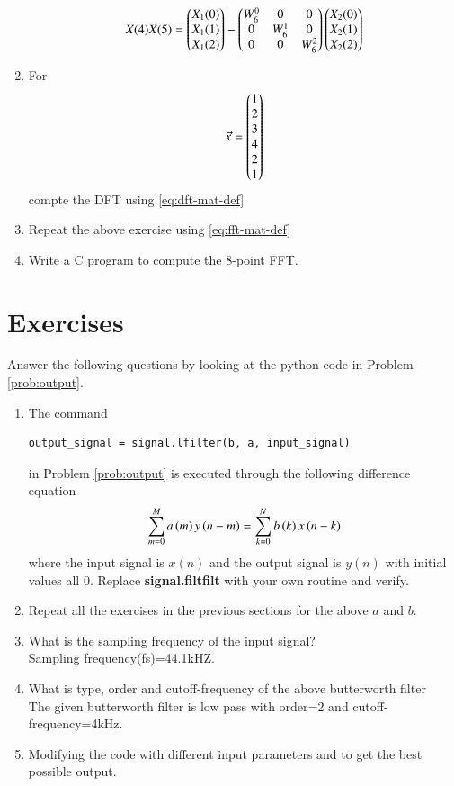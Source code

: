 \documentclass[journal,12pt,twocolumn]{IEEEtran}
\renewcommand\thesection{\arabic{section}}
\begin{document}
\begin{enumerate}[label=\arabic*.,ref=\thesection.\theenumi]
\begin{equation}
{			X(4) \\ 
			X(5) 
		}
		=
		\begin{pmatrix}
			X_{1}(0) \\ 
			X_{1}(1)\\ 
			X_{1}(2)
		\end{pmatrix}
		-
		\begin{pmatrix}
			W^{0}_{6} & 0 & 0\\
			0 & W^{1}_{6} & 0\\
			0 & 0 & W^{2}_{6}
		\end{pmatrix}
		\begin{pmatrix}
			X_{2}(0) \\ 
			X_{2}(1) \\ 
			X_{2}(2)
		\end{pmatrix}
		\label{eq:fft-mat-def}
	\end{equation}
	\item For 
	\begin{align}
		\vec{x} = \begin{pmatrix}1\\2\\3\\4\\2\\1\end{pmatrix}
		\label{eq:equation1}
	\end{align}
	compte the DFT using 
	\eqref{eq:dft-mat-def}
	\item Repeat the above exercise using
	\eqref{eq:fft-mat-def}
	\item Write a C program to compute the 8-point FFT. 
\end{enumerate}
\section{Exercises}
Answer the following questions by looking at the python code in Problem \ref{prob:output}.
\begin{enumerate}[label=\thesection.\arabic*]
	\item
	The command
	\begin{lstlisting}
output_signal = signal.lfilter(b, a, input_signal)
	\end{lstlisting}
	in Problem \ref{prob:output} is executed through the following difference equation
	\begin{equation}
		\label{eq:iir_filter_gen}
		\sum _{m=0}^{M}a\left(m\right)y\left(n-m\right)=\sum _{k=0}^{N}b\left(k\right)x\left(n-k\right)
	\end{equation}
	where the input signal is $x(n)$ and the output signal is $y(n)$ with initial values all 0. Replace
	\textbf{signal.filtfilt} with your own routine and verify.
	\item Repeat all the exercises in the previous sections for the above $a$ and $b$.
	\item What is the sampling frequency of the input signal?
	\\
	\solution
	Sampling frequency(fs)=44.1kHZ.
	\item
	What is type, order and  cutoff-frequency of the above butterworth filter
	\\
	\solution
	The given butterworth filter is low pass with order=2 and cutoff-frequency=4kHz.
	\item
	Modifying the code with different input parameters and to get the best possible output.
\end{enumerate}
\end{document}
